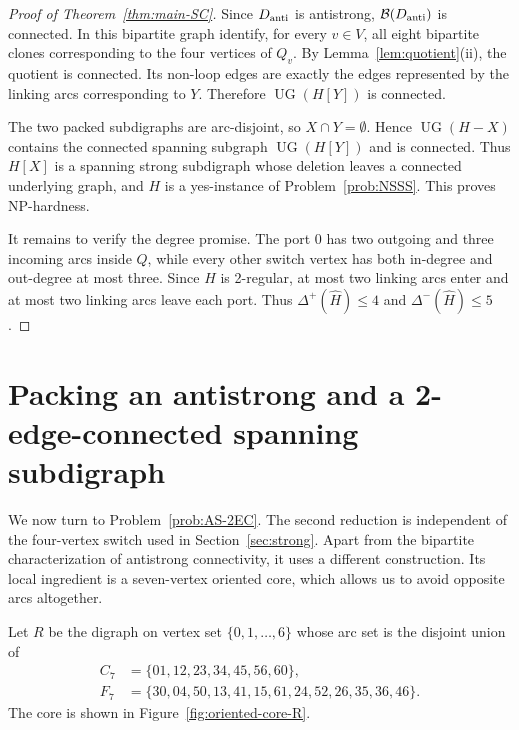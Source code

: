 \documentclass[12pt]{article}
\theoremstyle{remark}
\newcommand{\UG}{\operatorname{UG}}
\newcommand{\cB}{\mathcal{B}}
\begin{document}
\begin{proof}[Proof of Theorem~\ref{thm:main-SC}]
Since $D_{\rm anti}$ is antistrong, $\cB(D_{\rm anti})$ is connected.
In this bipartite graph identify, for every $v\in V$, all eight bipartite clones corresponding to the four vertices of $Q_v$.
By Lemma~\ref{lem:quotient}(ii), the quotient is connected.  Its non-loop edges are exactly the edges represented by the linking arcs corresponding to $Y$.  Therefore $\UG(H[Y])$ is connected.

The two packed subdigraphs are arc-disjoint, so $X\cap Y=\emptyset$.
Hence $\UG(H-X)$ contains the connected spanning subgraph
$\UG(H[Y])$ and is connected.  Thus $H[X]$ is a spanning strong subdigraph whose deletion leaves a connected underlying graph, and
$H$ is a yes-instance of Problem~\ref{prob:NSSS}.  This proves NP-hardness.

It remains to verify the degree promise. The port $0$ has two outgoing and three incoming arcs inside $Q$, while every other switch
vertex has both in-degree and out-degree at most three.  Since $H$ is 2-regular, at most two linking arcs enter and at most two linking arcs
leave each port.  Thus
$\Delta^+(\widehat H)\le 4$
and $\Delta^-(\widehat H)\le 5$.
\end{proof}

\section{Packing an antistrong and a 2-edge-connected spanning subdigraph}\label{sec:2ec}

We now turn to Problem~\ref{prob:AS-2EC}.  The second reduction is independent of the four-vertex switch used in Section~\ref{sec:strong}.  Apart from the bipartite
characterization of antistrong connectivity, it uses a different construction.  Its local ingredient is a seven-vertex oriented core, which allows us to avoid opposite arcs altogether.

Let $R$ be the digraph on vertex set $\{0,1,\ldots,6\}$ whose arc set is the disjoint union of
\begin{align*}
 C_7&=\{01,12,23,34,45,56,60\},\\
 F_7&=\{30,04,50,13,41,15,61,24,52,26,35,36,46\}.
\end{align*}
The core is shown in Figure~\ref{fig:oriented-core-R}.
\end{document}
